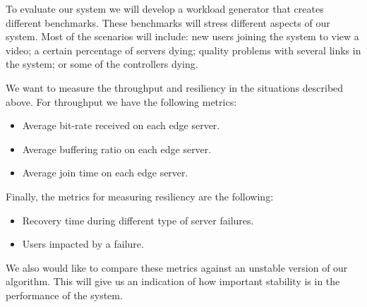 To evaluate our system we will develop a workload generator that creates different benchmarks. These benchmarks will stress different aspects of our system. Most of the scenarios will include: new users joining the system to view a video; a certain percentage of servers dying; quality problems with several links in the system; or some of the controllers dying.

We want to measure the throughput and resiliency in the situations described above. For throughput we have the following metrics:

\begin{itemize}
\item Average bit-rate received on each edge server.
\item Average buffering ratio on each edge server.
\item Average join time on each edge server.
\end{itemize}

Finally, the metrics for measuring resiliency are the following:

\begin{itemize}
\item Recovery time during different type of server failures.
\item Users impacted by a failure.
\end{itemize}

We also would like to compare these metrics against an unstable version of our algorithm. This will give us an indication of how important stability is in the performance of the system.
